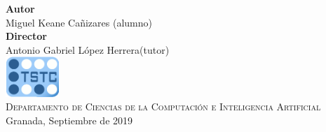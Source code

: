 \vspace{2.5cm}
\noindent\hspace*{\centeroffset}\begin{minipage}{\textwidth}
\centering

\textbf{Autor}\\ {Miguel Keane Cañizares (alumno)}\\[2.5ex]
\textbf{Director}\\
{Antonio Gabriel López Herrera(tutor)}\\[2cm]
\includegraphics[width=0.15\textwidth]{imagenes/tstc.png}\\[0.1cm]
\textsc{Departamento de Ciencias de la Computación e Inteligencia Artificial}\\
Granada, Septiembre de 2019
\end{minipage}
\addtolength{\textwidth}{\centeroffset}

 


